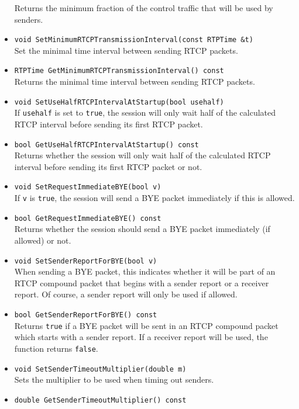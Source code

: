 \documentclass[12pt,a4paper]{article}
\begin{document}
\begin{itemize}
						Returns the minimum fraction of the control traffic that
						will be used by senders.
					\item {\tt void SetMinimumRTCPTransmissionInterval(const RTPTime \&t)}\\
						Set the minimal time interval between sending RTCP packets.
					\item {\tt RTPTime GetMinimumRTCPTransmissionInterval() const}\\
						Returns the minimal time interval between sending RTCP packets.
					\item {\tt void SetUseHalfRTCPIntervalAtStartup(bool usehalf)}\\
						If {\tt usehalf} is set to {\tt true}, the session will only
						wait half of the calculated RTCP interval before sending its
						first RTCP packet.
					\item {\tt bool GetUseHalfRTCPIntervalAtStartup() const}\\
						Returns whether the session will only
						wait half of the calculated RTCP interval before sending its
						first RTCP packet or not.
					\item {\tt void SetRequestImmediateBYE(bool v) }\\
						If {\tt v} is {\tt true}, the session will send a BYE
						packet immediately if this is allowed.
					\item {\tt bool GetRequestImmediateBYE() const}\\
						Returns whether the session should send a BYE packet immediately
						(if allowed) or not.
					\item {\tt void SetSenderReportForBYE(bool v)}\\
						When sending a BYE packet, this indicates whether it will be part
						of an RTCP compound packet that begins with a sender report or a
						receiver report. Of course, a sender report will only be used if
						allowed.
					\item {\tt bool GetSenderReportForBYE() const}\\
						Returns {\tt true} if a BYE packet will be sent in an RTCP compound
						packet which starts with a sender report. If a receiver report will
						be used, the function returns {\tt false}.
					\item {\tt void SetSenderTimeoutMultiplier(double m)}\\
						Sets the multiplier to be used when timing out senders.
					\item {\tt double GetSenderTimeoutMultiplier() const}\\

\end{itemize}
\end{document}
